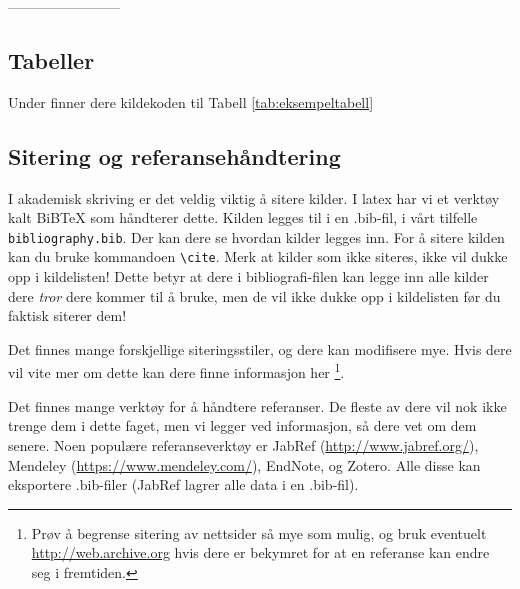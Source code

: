 ------------------------

\subsection{Tabeller}
Under finner dere kildekoden til Tabell \ref{tab:eksempeltabell}

\subsection{Sitering og referansehåndtering}
I akademisk skriving er det veldig viktig å sitere kilder. I latex har vi et verktøy kalt BiBTeX som 
håndterer dette. Kilden legges til i en .bib-fil, i vårt tilfelle \texttt{bibliography.bib}. Der kan dere
se hvordan kilder legges inn. For å sitere kilden kan du bruke kommandoen \texttt{\textbackslash{cite}}.
Merk at kilder som ikke siteres, ikke vil dukke opp i kildelisten! Dette betyr at dere i bibliografi-filen kan
legge inn alle kilder dere \emph{tror} dere kommer til å bruke, men de vil ikke dukke opp i kildelisten før du
faktisk siterer dem!

Det finnes mange forskjellige siteringsstiler, og dere kan modifisere mye. Hvis dere vil vite mer om dette
kan dere finne informasjon her \cite{BiberBibtexEtc,WikibookLatex}\footnote{Prøv å begrense sitering av 
nettsider så mye som mulig, og bruk eventuelt \url{http://web.archive.org} hvis dere er bekymret for at en 
referanse kan endre seg i fremtiden.}.

Det finnes mange verktøy for å håndtere referanser. 
De fleste av dere vil nok ikke trenge dem i dette faget, men vi legger ved informasjon, så dere vet om dem 
senere. Noen populære referanseverktøy er JabRef (\url{http://www.jabref.org/}), Mendeley (\url{https://www.mendeley.com/}), EndNote, og Zotero. Alle disse kan eksportere .bib-filer (JabRef lagrer alle
data i en .bib-fil).
